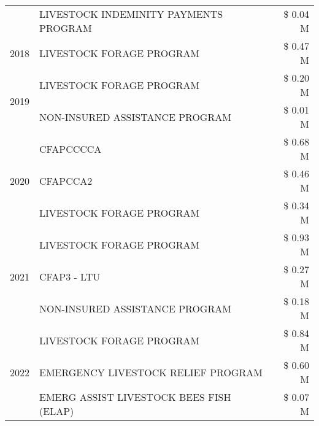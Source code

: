 \begin{tabular}{llr}
 & LIVESTOCK INDEMINITY PAYMENTS PROGRAM & \$ 0.04 M \\
\cline{1-3}
2018 & LIVESTOCK FORAGE PROGRAM & \$ 0.47 M \\
\cline{1-3}
\multirow[t]{2}{*}{2019} & LIVESTOCK FORAGE PROGRAM & \$ 0.20 M \\
 & NON-INSURED ASSISTANCE PROGRAM & \$ 0.01 M \\
\cline{1-3}
\multirow[t]{3}{*}{2020} & CFAPCCCCA & \$ 0.68 M \\
 & CFAPCCA2 & \$ 0.46 M \\
 & LIVESTOCK FORAGE PROGRAM & \$ 0.34 M \\
\cline{1-3}
\multirow[t]{3}{*}{2021} & LIVESTOCK FORAGE PROGRAM & \$ 0.93 M \\
 & CFAP3 - LTU & \$ 0.27 M \\
 & NON-INSURED ASSISTANCE PROGRAM & \$ 0.18 M \\
\cline{1-3}
\multirow[t]{3}{*}{2022} & LIVESTOCK FORAGE PROGRAM & \$ 0.84 M \\
 & EMERGENCY LIVESTOCK RELIEF PROGRAM & \$ 0.60 M \\
 & EMERG ASSIST LIVESTOCK BEES FISH (ELAP) & \$ 0.07 M \\
\cline{1-3}
\bottomrule
\end{tabular}
